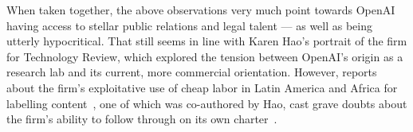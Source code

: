 When taken together, the above observations very much point towards OpenAI
having access to stellar public relations and legal talent --- as well as being
utterly hypocritical. That still seems in line with Karen Hao's portrait of the
firm for Technology Review, which explored the tension between OpenAI's origin
as a research lab and its current, more commercial orientation. However, reports
about the firm's exploitative use of cheap labor in Latin America and Africa for
labelling content~\cite{HaoHernandez2022,Perrigo2023a}, one of which was
co-authored by Hao, cast grave doubts about the firm's ability to follow through
on its own charter~\cite{OpenAI2018}.
